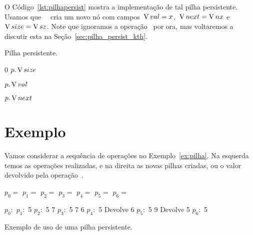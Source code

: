 \documentclass[main.tex]{subfiles}
\begin{document}
O Código~\ref{lst:pilhapersist} mostra a implementação de tal pilha persistente. Usamos que~{~} cria um novo nó com campos~$\operatorname{V}{val} = x$,~$\operatorname{V}{next} = \operatorname{V}{nx}$ e~$\operatorname{V}{size} = \operatorname{V}{sz}$. Note que ignoramos a operação~ por ora, mas voltaremos a discutir esta na Seção~\ref{sec:pilha_persist_kth}.


\begin{algorithm}
\caption{Pilha persistente.} \label{lst:pilhapersist}
\begin{algorithmic}[1]

	\State \Return \Null
\EndFunction

		\State \Return $0$
	\Else
		\State \Return $p.\operatorname{V}{size}$
	\EndIf
\EndFunction

	\State \Return \New {}
\EndFunction

	\State \Return $p.\operatorname{V}{val}$
\EndFunction

	\State \Return $p.\operatorname{V}{next}$
\EndFunction

\end{algorithmic}
\end{algorithm}

\section{Exemplo}

Vamos considerar a sequência de operações no Exemplo~\ref{ex:pilha}. Na esquerda temos as operações realizadas, e na direita as novas pilhas criadas, ou o valor devolvido pela operação~.

\begin{example}
\centering

\begin{subalgorithm}{0.4\textwidth}
\begin{algorithmic}

\State $p_0 =$ 
\State $p_1 =$ 
\State $p_2 =$ 
\State $p_3 =$ 
\State $p_4 =$ 
\State {}
\State $p_5 =$ 
\State {}
\State $p_6 =$ 

\end{algorithmic}
\end{subalgorithm} \vrule
\begin{subalgorithm}{0.4\textwidth}
\begin{algorithmic}

\State $p_0:$
\State $p_1:$ 5
\State $p_2:$ 5 7
\State $p_3:$ 5 7 6
\State $p_4:$ 5
\State Devolve 6
\State $p_5:$ 5 9
\State Devolve 5
\State $p_6:$ 5

\end{algorithmic}
\end{subalgorithm}
\caption{Exemplo de uso de uma pilha persistente.} \label{ex:pilha}
\end{example}
\end{document}
